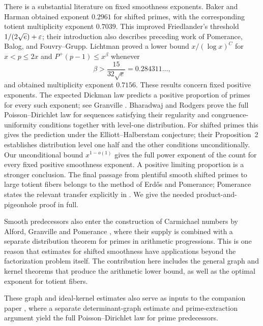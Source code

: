 There is a substantial literature on fixed smoothness exponents.
Baker and Harman \cite[Section~1, Theorem~1 and Corollary~1]{BakerHarman1998}
obtained exponent $0.2961$ for shifted primes, with the corresponding
totient multiplicity exponent $0.7039$. This improved Friedlander's
threshold $1/(2\sqrt e)+\varepsilon$; their introduction also describes
preceding work of Pomerance, Balog, and Fouvry--Grupp.
Lichtman \cite[Theorem~1.1 and Corollary~1.3]{Lichtman2022}
proved a lower bound $x/(\log x)^C$ for $x<p\le2x$ and
$P^+(p-1)\le x^\beta$ whenever
\[
 \beta>\frac{15}{32\sqrt e}=0.284311\ldots,
\]
and obtained multiplicity exponent $0.7156$.
These results concern fixed positive exponents. The expected
Dickman law predicts a positive proportion of primes for every such
exponent; see Granville \cite[Section~5.3]{Granville2008}.
Bharadwaj and Rodgers \cite[Theorem~7, Proposition~2,
and Conjecture~5]{BharadwajRodgers2026} prove the full
Poisson--Dirichlet law for sequences satisfying their regularity and
congruence-uniformity conditions together with level-one distribution.
For shifted primes this gives the prediction under the
Elliott--Halberstam conjecture; their Proposition~2 establishes
distribution level one half and the other conditions unconditionally.
Our unconditional bound $x^{1-o(1)}$ gives the full power exponent of
the count for every fixed positive smoothness exponent. A positive
limiting proportion is a stronger conclusion.
The final passage from plentiful smooth shifted primes to large
totient fibers belongs to the method of Erd\H{o}s and Pomerance;
Pomerance states the relevant transfer explicitly in
\cite[Theorem~B]{Pomerance1980}. We give the needed
product-and-pigeonhole proof in full.

Smooth predecessors also enter the construction of Carmichael numbers
by Alford, Granville and Pomerance \cite{AlfordGranvillePomerance1994},
where their supply is combined with a separate distribution theorem
for primes in arithmetic progressions. This is one reason that
estimates for shifted smoothness have applications beyond the
factorization problem itself. The contribution here includes the
general graph and kernel theorems that produce the arithmetic lower
bound, as well as the optimal exponent for totient fibers.

These graph and ideal-kernel estimates also serve as inputs to the
companion paper \cite[Theorem~1.1]{PrimePredecessors}, where a separate
determinant-graph estimate and prime-extraction argument yield the full
Poisson--Dirichlet law for prime predecessors.

